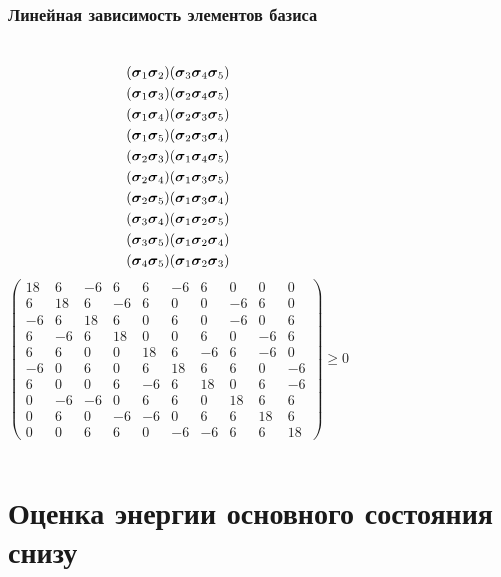 \documentclass{beamer}
\begin{document}
\begin{frame}
\frametitle{Линейная зависимость элементов базиса}
\small
\begin{columns}[c] %
$$\begin{gathered}
(\cc_1\cc_2) (\cc_3\cc_4\cc_5)\\
(\cc_1\cc_3) (\cc_2\cc_4\cc_5)\\
(\cc_1\cc_4) (\cc_2\cc_3\cc_5)\\
(\cc_1\cc_5) (\cc_2\cc_3\cc_4)\\
(\cc_2\cc_3) (\cc_1\cc_4\cc_5)\\
(\cc_2\cc_4) (\cc_1\cc_3\cc_5)\\
(\cc_2\cc_5) (\cc_1\cc_3\cc_4)\\
(\cc_3\cc_4) (\cc_1\cc_2\cc_5)\\
(\cc_3\cc_5) (\cc_1\cc_2\cc_4)\\
(\cc_4\cc_5) (\cc_1\cc_2\cc_3)
\end{gathered}$$
$$\begin{pmatrix}
18& 6& -6& 6& 6& -6& 6& 0& 0& 0\\
6& 18& 6& -6& 6& 0& 0& -6& 6& 0\\
-6& 6& 18& 6& 0& 6& 0& -6& 0& 6\\
6& -6& 6& 18& 0& 0& 6& 0& -6& 6\\
6& 6& 0& 0& 18& 6& -6& 6& -6& 0\\
-6& 0& 6& 0& 6& 18& 6& 6& 0& -6\\
6& 0& 0& 6& -6& 6& 18& 0& 6& -6\\
0& -6& -6& 0& 6& 6& 0& 18& 6& 6\\
0& 6& 0& -6& -6& 0& 6& 6& 18& 6\\
0& 0& 6& 6& 0& -6& -6& 6& 6& 18
\end{pmatrix}\geqslant 0$$
\end{columns}
\normalsize
\end{frame}


\section{Оценка энергии основного состояния снизу}%
\end{document}
